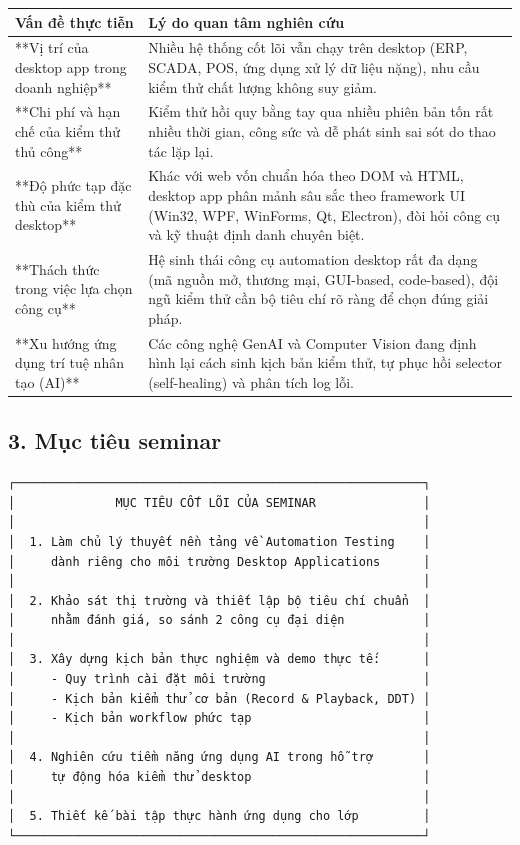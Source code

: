 \begin{table}[H]
\centering
\begin{tabular}{|l|l|}
\hline
\textbf{Vấn đề thực tiễn} & \textbf{Lý do quan tâm nghiên cứu} \\ \hline
**Vị trí của desktop app trong doanh nghiệp** & Nhiều hệ thống cốt lõi vẫn chạy trên desktop (ERP, SCADA, POS, ứng dụng xử lý dữ liệu nặng), nhu cầu kiểm thử chất lượng không suy giảm. \\ \hline
**Chi phí và hạn chế của kiểm thử thủ công** & Kiểm thử hồi quy bằng tay qua nhiều phiên bản tốn rất nhiều thời gian, công sức và dễ phát sinh sai sót do thao tác lặp lại. \\ \hline
**Độ phức tạp đặc thù của kiểm thử desktop** & Khác với web vốn chuẩn hóa theo DOM và HTML, desktop app phân mảnh sâu sắc theo framework UI (Win32, WPF, WinForms, Qt, Electron), đòi hỏi công cụ và kỹ thuật định danh chuyên biệt. \\ \hline
**Thách thức trong việc lựa chọn công cụ** & Hệ sinh thái công cụ automation desktop rất đa dạng (mã nguồn mở, thương mại, GUI-based, code-based), đội ngũ kiểm thử cần bộ tiêu chí rõ ràng để chọn đúng giải pháp. \\ \hline
**Xu hướng ứng dụng trí tuệ nhân tạo (AI)** & Các công nghệ GenAI và Computer Vision đang định hình lại cách sinh kịch bản kiểm thử, tự phục hồi selector (self-healing) và phân tích log lỗi. \\ \hline
\end{tabular}
\end{table}





\subsection{3. Mục tiêu seminar}

\begin{lstlisting}
┌─────────────────────────────────────────────────────────┐
│              MỤC TIÊU CỐT LÕI CỦA SEMINAR               │
│                                                         │
│  1. Làm chủ lý thuyết nền tảng về Automation Testing    │
│     dành riêng cho môi trường Desktop Applications      │
│                                                         │
│  2. Khảo sát thị trường và thiết lập bộ tiêu chí chuẩn  │
│     nhằm đánh giá, so sánh 2 công cụ đại diện           │
│                                                         │
│  3. Xây dựng kịch bản thực nghiệm và demo thực tế:      │
│     - Quy trình cài đặt môi trường                      │
│     - Kịch bản kiểm thử cơ bản (Record & Playback, DDT) │
│     - Kịch bản workflow phức tạp                        │
│                                                         │
│  4. Nghiên cứu tiềm năng ứng dụng AI trong hỗ trợ       │
│     tự động hóa kiểm thử desktop                        │
│                                                         │
│  5. Thiết kế bài tập thực hành ứng dụng cho lớp         │
└─────────────────────────────────────────────────────────┘
\end{lstlisting}



